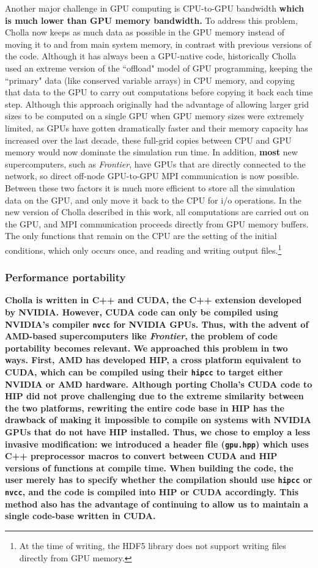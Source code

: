\documentclass[modern, linenumbers]{aastex631}
\begin{document}
Another major challenge in GPU computing is CPU-to-GPU bandwidth \textbf{which is much lower than GPU memory bandwidth.} To address this problem, Cholla now keeps as much data as possible in the GPU memory instead of moving it to and from main system memory, in contrast with previous versions of the code. Although it has always been a GPU-native code, historically Cholla used an extreme version of the ``offload" model of GPU programming, keeping the ``primary" data (like conserved variable arrays) in CPU memory, and copying that data to the GPU to carry out computations before copying it back each time step. Although this approach originally had the advantage of allowing larger grid sizes to be computed on a single GPU when GPU memory sizes were extremely limited, as GPUs have gotten dramatically faster and their memory capacity has increased over the last decade, these full-grid copies between CPU and GPU memory would now dominate the simulation run time. In addition, \textbf{most} new supercomputers, such as \textit{Frontier}, have GPUs that are directly connected to the network, so direct off-node GPU-to-GPU MPI communication is now possible. Between these two factors it is much more efficient to store all the simulation data on the GPU, and only move it back to the CPU for i/o operations. In the new version of Cholla described in this work, all computations are carried out on the GPU, and  MPI communication proceeds directly from GPU memory buffers. The only functions that remain on the CPU are the setting of the initial conditions, which only occurs once, and reading and writing output files.\footnote{At the time of writing, the HDF5 library does not support writing files directly from GPU memory.}

\subsubsection{Performance portability}

\textbf{Cholla is written in C++ and CUDA, the C++ extension developed by NVIDIA. However, CUDA code can only be compiled using NVIDIA's compiler \texttt{nvcc} for NVIDIA GPUs. Thus, with the advent of AMD-based supercomputers like \emph{Frontier}, the problem of code portability becomes relevant. We approached this problem in two ways. First, AMD has developed HIP, a cross platform equivalent to CUDA, which can be compiled using their \texttt{hipcc} to target either NVIDIA or AMD hardware. Although porting Cholla's CUDA code to HIP did not prove challenging due to the extreme similarity between the two platforms, rewriting the entire code base in HIP has the drawback of making it impossible to compile on systems with NVIDIA GPUs that do not have HIP installed. Thus, we chose to employ a less invasive modification: we introduced a header file (\texttt{gpu.hpp}) which uses C++ preprocessor macros to convert between CUDA and HIP versions of functions at compile time. When building the code, the user merely has to specify whether the compilation should use \texttt{hipcc} or \texttt{nvcc}, and the code is compiled into HIP or CUDA accordingly. This method also has the advantage of continuing to allow us to maintain a single code-base written in CUDA.}
\end{document}

